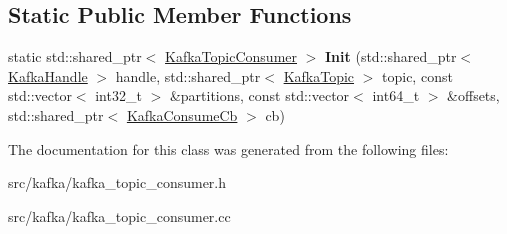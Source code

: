 \subsection*{Static Public Member Functions}
\begin{DoxyCompactItemize}
\item 
static std\+::shared\+\_\+ptr$<$ \hyperlink{classlog2hdfs_1_1KafkaTopicConsumer}{Kafka\+Topic\+Consumer} $>$ {\bfseries Init} (std\+::shared\+\_\+ptr$<$ \hyperlink{classlog2hdfs_1_1KafkaHandle}{Kafka\+Handle} $>$ handle, std\+::shared\+\_\+ptr$<$ \hyperlink{classlog2hdfs_1_1KafkaTopic}{Kafka\+Topic} $>$ topic, const std\+::vector$<$ int32\+\_\+t $>$ \&partitions, const std\+::vector$<$ int64\+\_\+t $>$ \&offsets, std\+::shared\+\_\+ptr$<$ \hyperlink{classlog2hdfs_1_1KafkaConsumeCb}{Kafka\+Consume\+Cb} $>$ cb)\hypertarget{classlog2hdfs_1_1KafkaTopicConsumer_a358f0f3ac13a0f618786e176a8592bc9}{}\label{classlog2hdfs_1_1KafkaTopicConsumer_a358f0f3ac13a0f618786e176a8592bc9}

\end{DoxyCompactItemize}


The documentation for this class was generated from the following files\+:\begin{DoxyCompactItemize}
\item 
src/kafka/kafka\+\_\+topic\+\_\+consumer.\+h\item 
src/kafka/kafka\+\_\+topic\+\_\+consumer.\+cc\end{DoxyCompactItemize}

